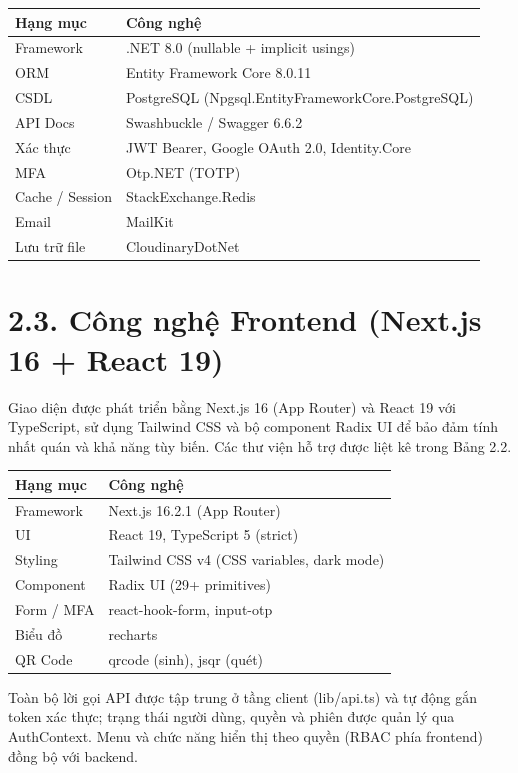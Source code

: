 \begin{center}{\singlespacing\renewcommand{\arraystretch}{1.25}
\begin{tabular}{|>{\raggedright\arraybackslash}p{}|>{\raggedright\arraybackslash}p{}|}
\hline
\textbf{Hạng mục} & \textbf{Công nghệ} \\ \hline
Framework & .NET 8.​0 (nullable + implicit usings) \\ \hline
ORM & Entity Framework Core 8.​0.​11 \\ \hline
CSDL & PostgreSQL (Npgsql.​EntityFrameworkCore.​PostgreSQL) \\ \hline
API Docs & Swashbuckle / Swagger 6.​6.​2 \\ \hline
Xác thực & JWT Bearer, Google OAuth 2.​0, Identity.​Core \\ \hline
MFA & Otp.​NET (TOTP) \\ \hline
Cache / Session & StackExchange.​Redis \\ \hline
Email & MailKit \\ \hline
Lưu trữ file & CloudinaryDotNet \\ \hline
\end{tabular}}\end{center}
\section*{2.3. Công nghệ Frontend (Next.js 16 + React 19)}
Giao diện được phát triển bằng Next.js 16 (App Router) và React 19 với TypeScript, sử dụng Tailwind CSS và bộ component Radix UI để bảo đảm tính nhất quán và khả năng tùy biến. Các thư viện hỗ trợ được liệt kê trong Bảng 2.2.

\begin{center}{\singlespacing\renewcommand{\arraystretch}{1.25}
\begin{tabular}{|>{\raggedright\arraybackslash}p{}|>{\raggedright\arraybackslash}p{}|}
\hline
\textbf{Hạng mục} & \textbf{Công nghệ} \\ \hline
Framework & Next.​js 16.​2.​1 (App Router) \\ \hline
UI & React 19, TypeScript 5 (strict) \\ \hline
Styling & Tailwind CSS v4 (CSS variables, dark mode) \\ \hline
Component & Radix UI (29+ primitives) \\ \hline
Form / MFA & react-hook-form, input-otp \\ \hline
Biểu đồ & recharts \\ \hline
QR Code & qrcode (sinh), jsqr (quét) \\ \hline
\end{tabular}}\end{center}
Toàn bộ lời gọi API được tập trung ở tầng client (lib/api.ts) và tự động gắn token xác thực; trạng thái người dùng, quyền và phiên được quản lý qua AuthContext. Menu và chức năng hiển thị theo quyền (RBAC phía frontend) đồng bộ với backend.

